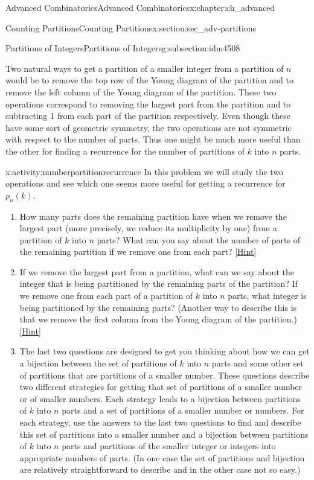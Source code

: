 \documentclass[oneside,10pt,]{book}
\numberwithin{equation}{chapter}
\begin{document}
\begin{chapterptx}{Advanced Combinatorics}{}{Advanced Combinatorics}{}{}{x:chapter:ch_advanced}
\begin{sectionptx}{Counting Partitions}{}{Counting Partitions}{}{}{x:section:sec_adv-partitions}
\begin{subsectionptx}{Partitions of Integers}{}{Partitions of Integers}{}{}{g:subsection:idm4508}
\par
Two natural ways to get a partition of a smaller integer from a partition of \(n\) would be to remove the top row of the Young diagram of the partition and to remove the left column of the Young diagram of the partition. These two operations correspond to removing the largest part from the partition and to subtracting 1 from each part of the partition respectively. Even though these have some sort of geometric symmetry, the two operations are not symmetric with respect to the number of parts. Thus one might be much more useful than the other for finding a recurrence for the number of partitions of \(k\) into \(n\) parts.%
\begin{activity}{}{x:activity:numberpartitionrecurrence}%
In this problem we will study the two operations and see which one seems more useful for getting a recurrence for \(p_n(k)\).%
\begin{enumerate}[font=\bfseries,label=(\alph*),ref=\alph*]
\item{}How many parts does the remaining partition have when we remove the largest part (more precisely, we reduce its multiplicity by one) from a partition of \(k\) into \(n\) parts?  What can you say about the number of parts of the remaining partition if we remove one from each part?%
\space\hspace*{0pt}\hfill{\tiny\hyperlink{g:hint:idm4729-back}{[Hint]}}\item{}If we remove the largest part from a partition, what can we say about the integer that is being partitioned by the remaining parts of the partition? If we remove one from each part of a partition of \(k\) into \(n\) parts, what integer is being partitioned by the remaining parts? (Another way to describe this is that we remove the first column from the Young diagram of the partition.)%
\space\hspace*{0pt}\hfill{\tiny\hyperlink{g:hint:idm4738-back}{[Hint]}}\item{}The last two questions are designed to get you thinking about how we can get a bijection between the set of partitions of \(k\) into \(n\) parts and some other set of partitions that are partitions of a smaller number.  These questions describe two different strategies for getting that set of partitions of a smaller number or of smaller numbers.  Each strategy leads to a bijection between partitions of \(k\) into \(n\) parts and a set of partitions of a smaller number or numbers.  For each strategy, use the answers to the last two questions to find and describe this set of partitions into a smaller number and a bijection between partitions of \(k\) into \(n\) parts and partitions of the smaller integer or integers into appropriate numbers of parts. (In one case the set of partitions and bijection are relatively straightforward to describe and in the other case not so easy.)%

\end{enumerate}
\end{activity}
\end{subsectionptx}
\end{sectionptx}
\end{chapterptx}
\end{document}
